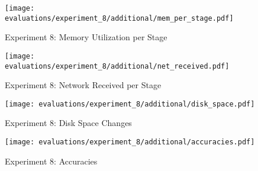 \begin{figure}[p]
    \begin{adjustwidth}{-0.2\paperwidth}{-0.2\paperwidth}
        \centering
        \texttt{[image: evaluations/experiment\_8/additional/mem\_per\_stage.pdf]}
        \caption{Experiment 8: Memory Utilization per Stage}
        \label{fig:eval_8_memory_per_stage}
    \end{adjustwidth}
\end{figure}

\begin{figure}[p]
    \begin{adjustwidth}{-0.2\paperwidth}{-0.2\paperwidth}
        \centering
        \texttt{[image: evaluations/experiment\_8/additional/net\_received.pdf]}
        \caption{Experiment 8: Network Received per Stage}
        \label{fig:eval_8_memory_per_stage}
    \end{adjustwidth}

    \begin{adjustwidth}{-0.2\paperwidth}{-0.2\paperwidth}
        \centering
        \texttt{[image: evaluations/experiment\_8/additional/disk\_space.pdf]}
        \caption{Experiment 8: Disk Space Changes}
        \label{fig:eval_8_disk_space}
    \end{adjustwidth}

    \begin{adjustwidth}{-0.2\paperwidth}{-0.2\paperwidth}
        \centering
        \texttt{[image: evaluations/experiment\_8/additional/accuracies.pdf]}
        \caption{Experiment 8: Accuracies}
        \label{fig:eval_8_accuracies}
    \end{adjustwidth}
\end{figure}